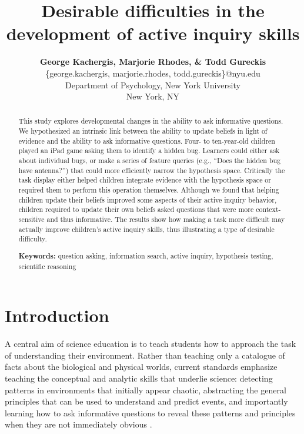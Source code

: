 \documentclass[10pt,letterpaper]{article}
\title{Desirable difficulties in the development of active inquiry skills}
\author{
  {\large \bf George Kachergis, Marjorie Rhodes, \& Todd Gureckis} \\
  \{george.kachergis, marjorie.rhodes, todd.gureckis\}@nyu.edu \\
  Department of Psychology, New York University \\
  New York, NY
}
\begin{document}
\maketitle

\begin{abstract}
This study explores developmental changes in the ability to ask 
informative questions.  We hypothesized an intrinsic link between the ability to 
update beliefs in light of evidence and the ability to ask informative questions. 
Four- to ten-year-old children 
played an iPad game asking them to identify a hidden bug. Learners could either 
ask about individual bugs, or make a series of feature queries (e.g., ``Does the 
hidden bug have antenna?'') that could more efficiently narrow the hypothesis 
space. Critically the task display either helped children integrate evidence 
with the hypothesis space or required them to perform this operation themselves.  Although we 
found that helping children update their beliefs improved some aspects of their active 
inquiry behavior, children required to update their own beliefs asked questions that 
were more context-sensitive and thus informative.  The results show how making a 
task more difficult may actually improve children's active inquiry skills, thus 
illustrating a type of desirable difficulty.

\textbf{Keywords:} 
question asking, information search, active inquiry, hypothesis testing, scientific 
reasoning
\end{abstract}


\section{Introduction} 


A central aim of science education is to teach students how to approach the task of 
understanding their environment. Rather than teaching only a catalogue of facts 
about the biological and physical worlds, current standards emphasize teaching the 
conceptual and analytic skills that underlie science: detecting patterns in 
environments that initially appear chaotic, abstracting the general principles that can 
be used to understand and predict events, and importantly learning how to ask 
informative questions to reveal these patterns and principles when they are not 
immediately obvious \cite{Bransford:2000,Donovan:2005,Duschl:2007}. 
\end{document}
